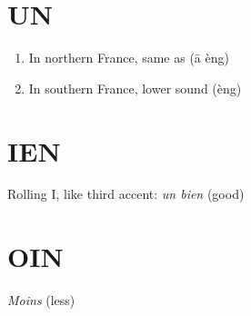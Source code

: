 \documentclass{book}
\begin{document}
    \section{UN }
        \begin{enumerate}
            \item In northern France, same as \textipa{[\~{E}]} (ā èng)
            \item In southern France, lower sound (èng)
        \end{enumerate}

    \section{IEN \textipa{[j\~{E}]}}
        Rolling I, like third accent: \textit{un bien} \textipa{[j\~{E}]} (good)
    
    \section{OIN \textipa{[w\~{E}]}}
        \textit{Moins} \textipa{[mw\~{E}]} (less)
\end{document}
